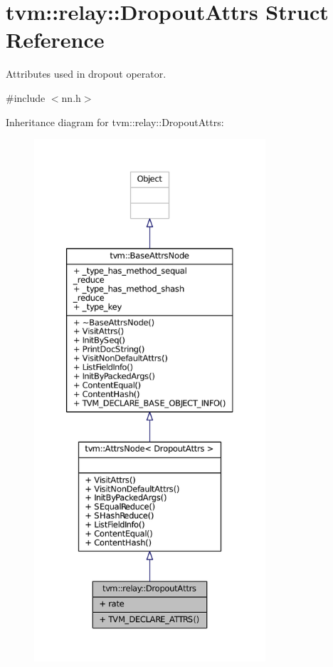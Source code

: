 \hypertarget{structtvm_1_1relay_1_1DropoutAttrs}{}\section{tvm\+:\+:relay\+:\+:Dropout\+Attrs Struct Reference}
\label{structtvm_1_1relay_1_1DropoutAttrs}


Attributes used in dropout operator.  




{\ttfamily \#include $<$nn.\+h$>$}



Inheritance diagram for tvm\+:\+:relay\+:\+:Dropout\+Attrs\+:
\nopagebreak
\begin{figure}[H]
\begin{center}
\leavevmode
\includegraphics[height=550pt]{structtvm_1_1relay_1_1DropoutAttrs__inherit__graph}
\end{center}
\end{figure}


